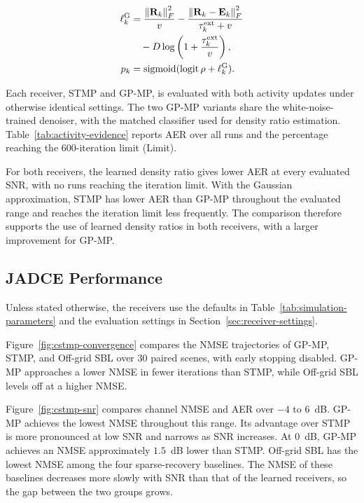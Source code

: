 \begin{align}
 \ell_k^{\rm G}&=\frac{\left\lVert\mathbf R_k\right\rVert_F^2}{v}
 -\frac{\left\lVert\mathbf R_k-\mathbf E_k\right\rVert_F^2}{\tau_k^{\rm ext}+v}
 \notag\\
 &\quad-D\log\left(1+\frac{\tau_k^{\rm ext}}{v}\right),
 \label{eq:gaussian-evidence}\\
 p_k&=\operatorname{sigmoid}(\operatorname{logit}\rho+\ell_k^{\rm G}).
 \label{eq:gaussian-activity}
\end{align}

Each receiver, STMP and GP-MP, is evaluated with both activity updates
under otherwise identical settings. The two GP-MP variants share the
white-noise-trained denoiser, with the matched classifier used for
density ratio estimation. Table~\ref{tab:activity-evidence} reports AER
over all runs and the percentage reaching the $600$-iteration limit
(Limit).

For both receivers, the learned density ratio gives lower AER at every
evaluated SNR, with no runs reaching the iteration limit. With the
Gaussian approximation, STMP has lower AER than GP-MP throughout the
evaluated range and reaches the iteration limit less frequently. The
comparison therefore supports the use of learned density ratios in
both receivers, with a larger improvement for GP-MP.

\subsection{JADCE Performance}
\label{sec:jadce-performance}
Unless stated otherwise, the receivers use the defaults in
Table~\ref{tab:simulation-parameters} and the evaluation settings in
Section~\ref{sec:receiver-settings}.

Figure~\ref{fig:cstmp-convergence} compares the NMSE trajectories of
GP-MP, STMP, and Off-grid SBL over $30$ paired scenes, with early
stopping disabled. GP-MP approaches a lower NMSE in fewer iterations
than STMP, while Off-grid SBL levels off at a higher NMSE.

Figure~\ref{fig:cstmp-snr} compares channel NMSE and AER over
$-4$ to $6$~dB. GP-MP achieves the lowest NMSE throughout this range.
Its advantage over STMP is more pronounced at low SNR and narrows as
SNR increases. At $0$~dB, GP-MP achieves an NMSE approximately
$1.5$~dB lower than STMP. Off-grid SBL has the lowest NMSE among the four
sparse-recovery baselines. The NMSE of these baselines decreases more
slowly with SNR than that of the learned receivers, so the gap between
the two groups grows.

